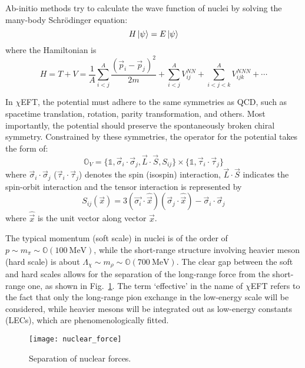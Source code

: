 Ab-initio methods try to calculate the wave function of nuclei by solving the
many-body Schr\"{o}dinger equation:
\begin{equation}
    H\ket{\psi} = E\ket{\psi}
\end{equation}
where the Hamiltonian is
\begin{equation}
    H = T + V = \frac{1}{A} \sum_{i<j}^A \frac{(\vec{p}_i - \vec{p}_j)^2}{2m} 
	+ \sum_{i<j}^A V_{ij}^{NN} + \sum_{i<j<k}^A V_{ijk}^{NNN} + \cdots
\end{equation}

In $\chi$EFT, the potential must adhere to the same symmetries as QCD,
such as spacetime translation, rotation, parity transformation, and others. 
Most importantly, the potential should preserve the spontaneously broken chiral symmetry. 
Constrained by these symmetries, the operator for the potential takes the form of:
\begin{equation}
    \mathds{O}_V = \{\mathds{1}, \vec{\sigma}_i \cdot \vec{\sigma}_j, \vec{L} \cdot \vec{S}, S_{ij}\} 
	\times \{\mathds{1}, \vec{\tau}_i \cdot \vec{\tau}_j\}
\end{equation}
where $\vec{\sigma}_i \cdot \vec{\sigma}_j$ ($\vec{\tau}_i \cdot \vec{\tau}_j$) 
denotes the spin (isospin) interaction, 
$\vec{L} \cdot \vec{S}$ indicates the spin-orbit interaction and the tensor interaction
is represented by
\begin{equation}
    S_{ij}(\vec{x}) = 3(\vec{\sigma_i} \cdot \hat{\vec{x}})(\vec{\sigma}_j \cdot \hat{\vec{x}}) - \vec{\sigma}_i \cdot \vec{\sigma}_j
\end{equation}
where $\hat{\vec{x}}$ is the unit vector along vector $\vec{x}$.

The typical momentum (soft scale) in nuclei is of the order of $p \sim m_\pi \sim \mathds{O}(100\ \mathrm{MeV})$, 
while the short-range structure involving heavier meson (hard scale) is about 
$\Lambda_\chi \sim m_\rho \sim \mathds{O}(700 \ \mathrm{MeV})$. 
The clear gap between the soft and hard scales allows for the separation of the 
long-range force from the short-range one, as shown in Fig.~\ref{fig:nuclear_potential}. 
The term `effective' in the name of $\chi$EFT refers to the fact that only the 
long-range pion exchange in the low-energy scale will be considered, 
while heavier mesons will be integrated out as low-energy constants (LECs), 
which are phenomenologically fitted. 
\begin{figure}[!h]
    \centering
    \texttt{[image: nuclear\_force]}
    \caption{Separation of nuclear forces.}
    \label{fig:nuclear_potential}
\end{figure}

